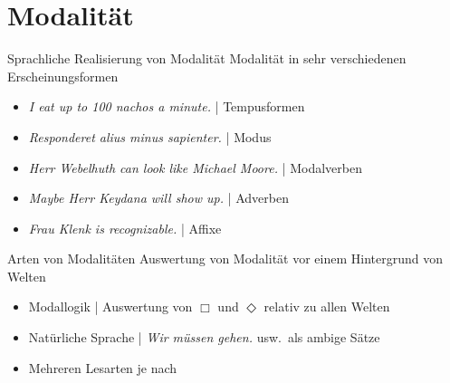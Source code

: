 \section{Modalität}

\begin{frame}
  {Sprachliche Realisierung von Modalität}
  \onslide<+->
  \onslide<+->
  Modalität in sehr verschiedenen Erscheinungsformen\\
  \Halbzeile
  \begin{itemize}[<+->]
    \item \textit{I \alert{eat up to} 100 nachos a minute.} | \alert{Tempusformen}
    \item \textit{\alert{Responderet} alius minus sapienter.} | \alert{Modus}
    \item \textit{Herr Webelhuth \alert{can} look like Michael Moore.} | \alert{Modalverben}
    \item \textit{\alert{Maybe} Herr Keydana will show up.} | \alert{Adverben}
    \item \textit{Frau Klenk is recogniz\alert{able}.} | \alert{Affixe}
  \end{itemize}
\end{frame}

\begin{frame}
  {Arten von Modalitäten}
  \onslide<+->
  \onslide<+->
  Auswertung von Modalität vor einem \alert{Hintergrund von Welten}
  \Halbzeile
  \begin{itemize}[<+->]
    \item Modallogik | Auswertung von $\Box$ und $\Diamond$ relativ zu \alert{allen Welten}\\
      \Halbzeile
    \item Natürliche Sprache | \textit{Wir müssen gehen.} usw.\ als \alert{ambige Sätze}
    \item \alert{Mehreren Lesarten} je nach 
  \end{itemize}
\end{frame}

